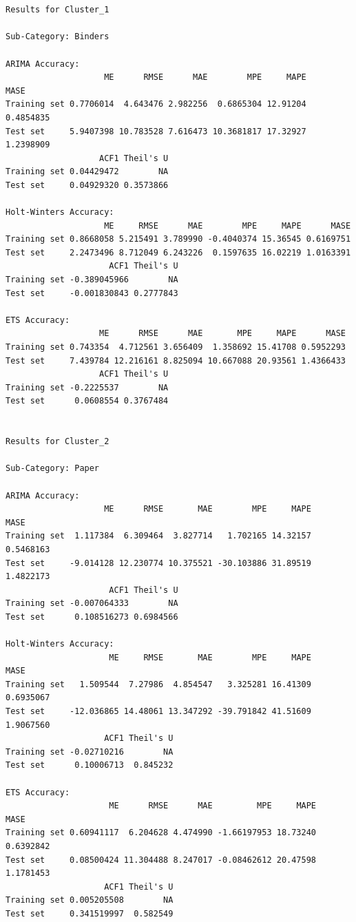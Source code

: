 \documentclass[
  letterpaper,
  DIV=11,
  numbers=noendperiod]{scrartcl}
\begin{document}
\begin{verbatim}


Results for Cluster_1 

Sub-Category: Binders 

ARIMA Accuracy:
                    ME      RMSE      MAE        MPE     MAPE      MASE
Training set 0.7706014  4.643476 2.982256  0.6865304 12.91204 0.4854835
Test set     5.9407398 10.783528 7.616473 10.3681817 17.32927 1.2398909
                   ACF1 Theil's U
Training set 0.04429472        NA
Test set     0.04929320 0.3573866

Holt-Winters Accuracy:
                    ME     RMSE      MAE        MPE     MAPE      MASE
Training set 0.8668058 5.215491 3.789990 -0.4040374 15.36545 0.6169751
Test set     2.2473496 8.712049 6.243226  0.1597635 16.02219 1.0163391
                     ACF1 Theil's U
Training set -0.389045966        NA
Test set     -0.001830843 0.2777843

ETS Accuracy:
                   ME      RMSE      MAE       MPE     MAPE      MASE
Training set 0.743354  4.712561 3.656409  1.358692 15.41708 0.5952293
Test set     7.439784 12.216161 8.825094 10.667088 20.93561 1.4366433
                   ACF1 Theil's U
Training set -0.2225537        NA
Test set      0.0608554 0.3767484


Results for Cluster_2 

Sub-Category: Paper 

ARIMA Accuracy:
                    ME      RMSE       MAE        MPE     MAPE      MASE
Training set  1.117384  6.309464  3.827714   1.702165 14.32157 0.5468163
Test set     -9.014128 12.230774 10.375521 -30.103886 31.89519 1.4822173
                     ACF1 Theil's U
Training set -0.007064333        NA
Test set      0.108516273 0.6984566

Holt-Winters Accuracy:
                     ME     RMSE       MAE        MPE     MAPE      MASE
Training set   1.509544  7.27986  4.854547   3.325281 16.41309 0.6935067
Test set     -12.036865 14.48061 13.347292 -39.791842 41.51609 1.9067560
                    ACF1 Theil's U
Training set -0.02710216        NA
Test set      0.10006713  0.845232

ETS Accuracy:
                     ME      RMSE      MAE         MPE     MAPE      MASE
Training set 0.60941117  6.204628 4.474990 -1.66197953 18.73240 0.6392842
Test set     0.08500424 11.304488 8.247017 -0.08462612 20.47598 1.1781453
                    ACF1 Theil's U
Training set 0.005205508        NA
Test set     0.341519997  0.582549



\end{verbatim}
\end{document}
